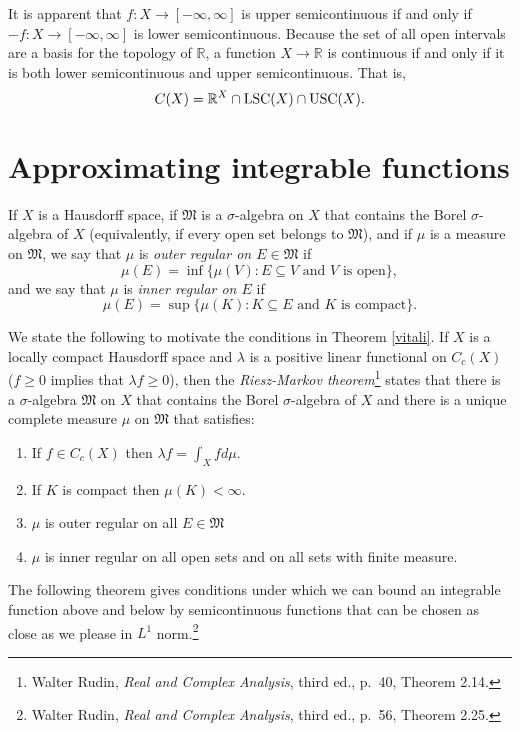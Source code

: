 \documentclass{article}
\newcommand{\LSC}{\ensuremath\mathrm{LSC}}
\newcommand{\USC}{\ensuremath\mathrm{USC}}
\theoremstyle{definition}
\begin{document}
It is apparent that $f:X \to [-\infty,\infty]$ is upper semicontinuous if and only if $-f:X \to [-\infty,\infty]$ is lower semicontinuous. 
Because the set of all open intervals are a basis for the topology of $\mathbb{R}$, a function $X \to \mathbb{R}$ is continuous if and only if it is both
lower semicontinuous and upper semicontinuous. 
That is,
\[
C(X) =  \mathbb{R}^X \cap \LSC(X) \cap \USC(X).
\]


\section{Approximating integrable functions}
If $X$ is a Hausdorff space, if $\mathfrak{M}$ is a $\sigma$-algebra on $X$ that contains the Borel $\sigma$-algebra of $X$ (equivalently, if every open set belongs
to $\mathfrak{M}$), and if $\mu$ is a measure on
$\mathfrak{M}$, we say that $\mu$ is {\em outer regular on $E \in \mathfrak{M}$}   if
\[
\mu(E) = \inf\{ \mu(V): \textrm{$E \subseteq V$ and $V$ is open}\}, 
\]
and 
we say that $\mu$ is {\em inner regular on $E$} if 
\[
\mu(E) = \sup\{ \mu(K) : \textrm{$K \subseteq E$ and $K$ is compact}\}.
\]

We state the following to motivate the conditions in Theorem \ref{vitali}.
If $X$ is a locally compact Hausdorff space and $\lambda$ is a positive linear functional on $C_c(X)$ ($f \geq 0$ implies that $\lambda f \geq 0$), then the {\em Riesz-Markov theorem}\footnote{Walter
Rudin, {\em Real and Complex Analysis}, third ed., p.~40, Theorem 2.14.} states that there is a $\sigma$-algebra $\mathfrak{M}$ on $X$ that contains the Borel 
$\sigma$-algebra of $X$ and there is a unique complete measure $\mu$ on $\mathfrak{M}$ that satisfies:
\begin{enumerate}
\item If $f \in C_c(X)$ then $\lambda f = \int_X fd\mu$.
\item If $K$ is compact then $\mu(K)<\infty$.
\item $\mu$ is outer regular on all $E \in \mathfrak{M}$
\item $\mu$ is inner regular on all open sets and  on all sets with finite measure.
\end{enumerate}


The following theorem gives conditions under which we can bound an integrable function above and below by semicontinuous functions that can be chosen as close
as we please in $L^1$ norm.\footnote{Walter Rudin, {\em Real and Complex Analysis}, third ed., p.~56, Theorem 2.25.}
\end{document}
